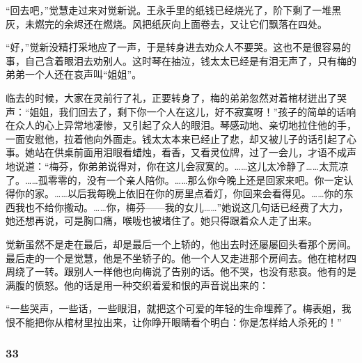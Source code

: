 \par “回去吧，”觉慧走过来对觉新说。王永手里的纸钱已经烧光了，阶下剩了一堆黑灰，未燃完的余烬还在燃烧。风把纸灰向上面卷去，又让它们飘落在四处。
\par “好，”觉新没精打采地应了一声，于是转身进去劝众人不要哭。这也不是很容易的事，自己含着眼泪去劝别人。这时琴在抽泣，钱太太已经是有泪无声了，只有梅的弟弟一个人还在哀声叫“姐姐”。
\par 临去的时候，大家在灵前行了礼，正要转身了，梅的弟弟忽然对着棺材迸出了哭声：“姐姐，我们回去了，剩下你一个人在这儿，好不寂寞呀！”孩子的简单的话响在众人的心上异常地凄惨，又引起了众人的眼泪。琴感动地、亲切地拉住他的手，一面安慰他，拉着他向外面走。钱太太本来已经止了悲，却又被儿子的话引起了心事。她站在供桌前面用泪眼看蜡烛，看香，又看灵位牌，过了一会儿，才语不成声地说道：“梅芬，你弟弟说得对，你在这儿会寂寞的。……这儿太冷静了……太荒凉了。……孤零零的，没有一个亲人陪你。……那么你今晚上还是回家来吧。你一定认得你的家。……以后我每晚上依旧在你的房里点着灯，你回来会看得见。……你的东西我也不给你搬动。……你，梅芬——我的女儿……”她说这几句话已经费了大力，她还想再说，可是胸口痛，喉咙也被堵住了。她只得跟着众人走了出来。
\par 觉新虽然不是走在最后，却是最后一个上轿的，他出去时还屡屡回头看那个房间。最后走的一个是觉慧，他是不坐轿子的。他一个人又走进那个房间去。他在棺材四周绕了一转。跟别人一样他也向梅说了告别的话。他不哭，也没有悲哀。他有的是满腹的愤怒。他的话是用一种交织着爱和恨的声音说出来的：
\par “一些哭声，一些话，一些眼泪，就把这个可爱的年轻的生命埋葬了。梅表姐，我恨不能把你从棺材里拉出来，让你睁开眼睛看个明白：你是怎样给人杀死的！”


\subsubsection*{33}

